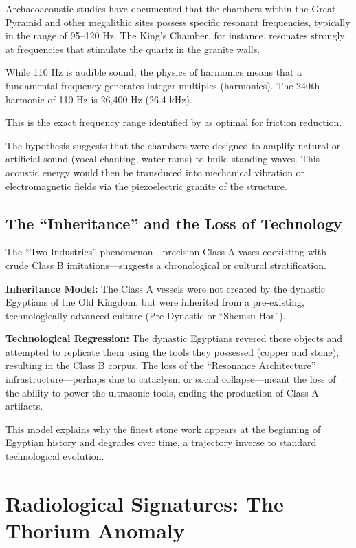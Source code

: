 \documentclass[11pt]{article}
\begin{document}
Archaeoacoustic studies have documented that the chambers within the Great Pyramid and other megalithic sites possess specific resonant frequencies, typically in the range of 95--120 Hz. The King's Chamber, for instance, resonates strongly at frequencies that stimulate the quartz in the granite walls.

While 110 Hz is audible sound, the physics of harmonics means that a fundamental frequency generates integer multiples (harmonics). The 240th harmonic of 110 Hz is 26,400 Hz (26.4 kHz).

This is the exact frequency range identified by \citet{Luo2024} as optimal for friction reduction.

The hypothesis suggests that the chambers were designed to amplify natural or artificial sound (vocal chanting, water rams) to build standing waves. This acoustic energy would then be transduced into mechanical vibration or electromagnetic fields via the piezoelectric granite of the structure.

\subsection{The ``Inheritance'' and the Loss of Technology}

The ``Two Industries'' phenomenon---precision Class A vases coexisting with crude Class B imitations---suggests a chronological or cultural stratification.

\textbf{Inheritance Model:} The Class A vessels were not created by the dynastic Egyptians of the Old Kingdom, but were inherited from a pre-existing, technologically advanced culture (Pre-Dynastic or ``Shemsu Hor'').

\textbf{Technological Regression:} The dynastic Egyptians revered these objects and attempted to replicate them using the tools they possessed (copper and stone), resulting in the Class B corpus. The loss of the ``Resonance Architecture'' infrastructure---perhaps due to cataclysm or social collapse---meant the loss of the ability to power the ultrasonic tools, ending the production of Class A artifacts.

This model explains why the finest stone work appears at the beginning of Egyptian history and degrades over time, a trajectory inverse to standard technological evolution.

\section{Radiological Signatures: The Thorium Anomaly}
\end{document}
